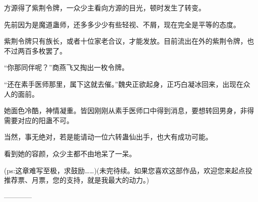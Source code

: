 \begin{this_body}
方源得了紫荆令牌，一众少主看向方源的目光，顿时发生了转变。

先前因为是魔道蛊师，还多多少少有些轻视、不屑，现在完全是平等的态度。

紫荆令牌只有族长，或者十位家老合议，才能发放。目前流出在外的紫荆令牌，也不过两百多枚罢了。

“你那同伴呢？”商燕飞又掏出一枚令牌。

“还在素手医师那里，属下这就去催。”魏央正欲起身，正巧白凝冰回来，出现在众人的面前。

她面色冷酷，神情凝重。皆因刚刚从素手医师口中得到消息，要想转回男身，非得需要对应的阳蛊不可。

当然，事无绝对，若是能请动一位六转蛊仙出手，也大有成功可能。

看到她的容颜，众少主都不由地呆了一呆。

(ps:这章难写至极，求鼓励……)(未完待续。如果您喜欢这部作品，欢迎您来起点投推荐票、月票，您的支持，就是我最大的动力。)

------------

\end{this_body}

